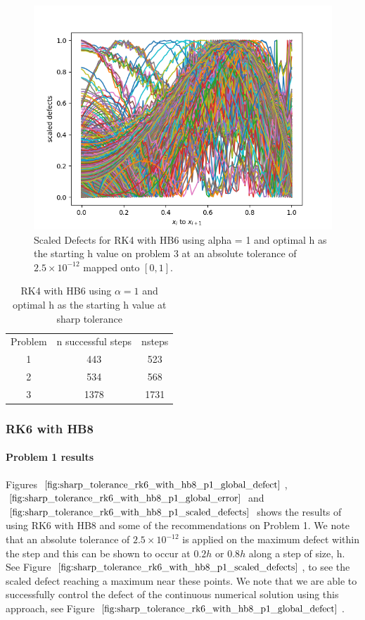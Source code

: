 \begin{figure}[H]
\centering
\includegraphics[width=0.7\linewidth]{./figures/sharp_tolerance_rk4_with_hb6_p3_scaled_defects}
\caption{Scaled Defects for RK4 with HB6 using alpha = 1 and optimal h as the starting h value on problem 3 at an absolute tolerance of $2.5 \times 10^{-12}$ mapped onto $[0, 1]$.}
\label{fig:sharp_tolerance_rk4_with_hb6_p3_scaled_defects}
\end{figure}

\begin{table}[h]
\caption {RK4 with HB6 using $\alpha = 1$ and optimal h as the starting h value at sharp tolerance} \label{tab:rk4_with_hb6_sharp_tolerance}
\begin{center}
\begin{tabular}{ c c c } 
Problem & n successful steps      &       nsteps \\ 
1       & 443                     &        523   \\ 
2       & 534                     &        568  \\
3       & 1378                    &        1731  \\
\end{tabular}
\end{center}
\end{table}	


\subsubsection{RK6 with HB8}

\paragraph{Problem 1 results}
Figures $\ref{fig:sharp_tolerance_rk6_with_hb8_p1_global_defect}$, $\ref{fig:sharp_tolerance_rk6_with_hb8_p1_global_error}$ and $\ref{fig:sharp_tolerance_rk6_with_hb8_p1_scaled_defects}$ shows the results of using RK6 with HB8 and some of the recommendations on Problem 1. We note that an absolute tolerance of $2.5 \times 10^{-12}$ is applied on the maximum defect within the step and this can be shown to occur at $0.2h$ or $0.8h$ along a step of size, h. See Figure $\ref{fig:sharp_tolerance_rk6_with_hb8_p1_scaled_defects}$, to see the scaled defect reaching a maximum near these points. We note that we are able to successfully control the defect of the continuous numerical solution using this approach, see Figure $\ref{fig:sharp_tolerance_rk6_with_hb8_p1_global_defect}$. 


